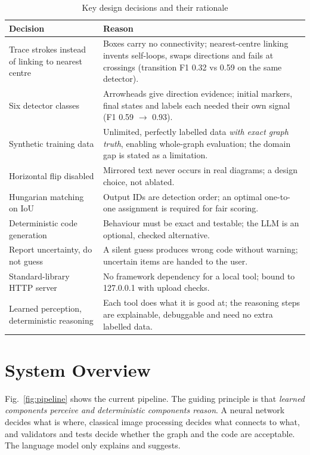 \documentclass[journal,10pt]{IEEEtran}
\begin{document}
\begin{table}[t]
\centering
\caption{Key design decisions and their rationale}
\label{tab:decisions}
\footnotesize
\begin{tabular}{@{}L{4.2cm}L{12.6cm}@{}}
\toprule
\textbf{Decision} & \textbf{Reason} \\
\midrule
Trace strokes instead of linking to nearest centre & Boxes carry no connectivity;
nearest-centre linking invents self-loops, swaps directions and fails at crossings
(transition F1 0.32 vs 0.59 on the same detector). \\
Six detector classes & Arrowheads give direction evidence; initial markers, final states
and labels each needed their own signal (F1 0.59 $\rightarrow$ 0.93). \\
Synthetic training data & Unlimited, perfectly labelled data \emph{with exact graph
truth}, enabling whole-graph evaluation; the domain gap is stated as a limitation. \\
Horizontal flip disabled & Mirrored text never occurs in real diagrams; a design choice,
not ablated. \\
Hungarian matching on IoU & Output IDs are detection order; an optimal one-to-one
assignment is required for fair scoring. \\
Deterministic code generation & Behaviour must be exact and testable; the LLM is an
optional, checked alternative. \\
Report uncertainty, do not guess & A silent guess produces wrong code without warning;
uncertain items are handed to the user. \\
Standard-library HTTP server & No framework dependency for a local tool; bound to
127.0.0.1 with upload checks. \\
Learned perception, deterministic reasoning & Each tool does what it is good at; the
reasoning steps are explainable, debuggable and need no extra labelled data. \\
\bottomrule
\end{tabular}
\end{table}

\section{System Overview}
\label{sec:system}
Fig.~\ref{fig:pipeline} shows the current pipeline. The guiding principle is that
\emph{learned components perceive and deterministic components reason}. A neural network
decides what is where, classical image processing decides what connects to what, and
validators and tests decide whether the graph and the code are acceptable. The language
model only explains and suggests.
\end{document}

